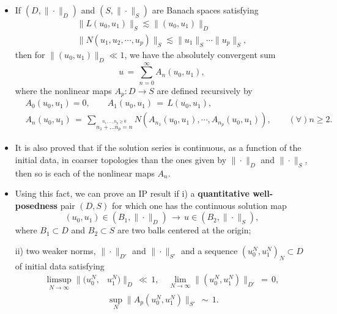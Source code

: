 \documentclass{beamer}
\numberwithin{equation}{section}
\begin{document}
\begin{frame}
  \begin{itemize}
\item If  $(D,\|\cdot \|_D)$ and $(S,\|\cdot \|_S)$ are Banach spaces satisfying 
\begin{gather*}
\|L(u_0,u_1)\|_S \lesssim \|(u_0,u_1)\|_D \\ \|N(u_{1}, u_{2}, \cdots, u_{p})\|_S \lesssim \| u_{1} \|_{S}\cdots\| u_{p} \|_{S}, 
\label{estim}
\end{gather*}
then for $ \|(u_0,u_1)\|_D\ll 1$, we have the absolutely convergent sum
\begin{equation*}
u\,=\,\sum_{n=0}^{\infty} A_{n}(u_0,u_1), 
\label{series}
\end{equation*}
\pause
where the nonlinear maps $A_{p}: D\to S$ are defined recursively by
\begin{equation*}
  \begin{split}
& A_{0}(u_0,u_1)=0, \qquad 
  A_1(u_0,u_1)\,=\,L(u_0,u_1), \qquad 
  \\
  & A_{n}(u_0,u_1)\,=\,\sum_{\stackrel{n_{1}, \ldots, n_{p} \ge 0}{n_{1} + \ldots n_{p} = n}} N(A_{n_1}(u_0,u_1),\cdots, A_{n_{p}}(u_0,u_1)), \qquad (\forall)n\geq 2.
\label{An}
\end{split}
\end{equation*}
\end{itemize}
\end{frame}
\begin{frame}
  \begin{itemize}
    \item It is also proved that if the solution series is continuous, as a function of the initial data, in coarser topologies than the ones given by $\| \cdot\|_D$ and $\| \cdot \|_S$, then so is each of the nonlinear maps $A_{n}$. 
      \pause
    \item
      Using this fact, we can prove an IP result if 
i) a \textbf{quantitative well-posedness} pair $(D,S)$ for which one has the continuous solution map 
\begin{equation*}
(u_0,u_1) \in (B_1,\|\cdot \|_D)\,\longrightarrow\,u\in (B_2,\|\cdot \|_S),
\end{equation*} 
where $B_1\subset D$ and $B_2 \subset S$ are two balls centered at the origin;

ii) two weaker norms, $\| \cdot\|_{D'}$ and $\| \cdot\|_{S'}$ and a sequence $\left(u^N_0,u^N_1\right)_N\subset D$ of initial data satisfying
\pause
\begin{align*}
\limsup_{N\to \infty} \|\big(u^N_0,&u^N_1\big)\|_D\,\ll\,1, \quad \lim_{N\to \infty} \|\left(u^N_0,u^N_1\right)\|_{D'}\,=\,0,
\\
&\sup_N \|A_{p}\left(u^N_0,u^N_1\right)\|_{S'}\,\sim\,1.
\label{cont}
\end{align*}
\end{itemize}
\end{frame}
\end{document}
